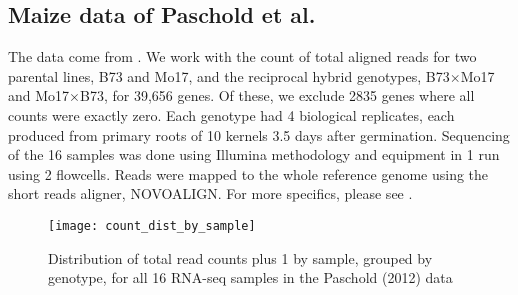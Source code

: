 \subsection{Maize data of Paschold et al.}
\label{intro-paschold}
The data come from \cite{paschold}. We work with the count of total aligned reads for two parental lines, B73 and Mo17, and the reciprocal hybrid genotypes, B73$\times$Mo17 and Mo17$\times$B73, for 39,656 genes. Of these, we exclude 2835 genes where all counts were exactly zero. Each genotype had 4 biological replicates, each produced from primary roots of 10 kernels 3.5 days after germination. Sequencing of the 16 samples was done using Illumina methodology and equipment in 1 run using 2 flowcells. Reads were mapped to the whole reference genome using the short reads aligner, NOVOALIGN. For more specifics, please see \cite{paschold}.


\begin{figure}
\centering
\begin{minipage}{.8\textwidth}
\texttt{[image: count\_dist\_by\_sample]}
\caption{Distribution of total read counts plus 1 by sample, grouped by genotype, for all 16 RNA-seq samples in the Paschold (2012) data}
\label{fig:count-dist}
\end{minipage}
\end{figure}

